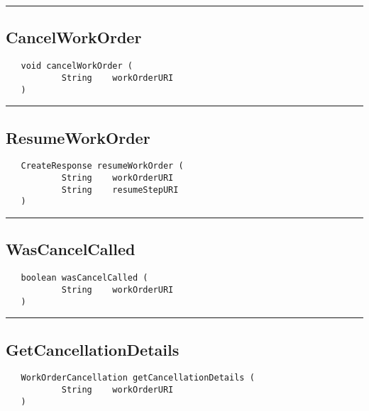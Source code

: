 \rule{15cm}{2pt}
\subsection{CancelWorkOrder}
\label{Api:CancelWorkOrder}
\begin{verbatim}
   void cancelWorkOrder (
           String    workOrderURI
   )
\end{verbatim}



\rule{15cm}{2pt}
\subsection{ResumeWorkOrder}
\label{Api:ResumeWorkOrder}
\begin{verbatim}
   CreateResponse resumeWorkOrder (
           String    workOrderURI
           String    resumeStepURI
   )
\end{verbatim}



\rule{15cm}{2pt}
\subsection{WasCancelCalled}
\label{Api:WasCancelCalled}
\begin{verbatim}
   boolean wasCancelCalled (
           String    workOrderURI
   )
\end{verbatim}



\rule{15cm}{2pt}
\subsection{GetCancellationDetails}
\label{Api:GetCancellationDetails}
\begin{verbatim}
   WorkOrderCancellation getCancellationDetails (
           String    workOrderURI
   )
\end{verbatim}



